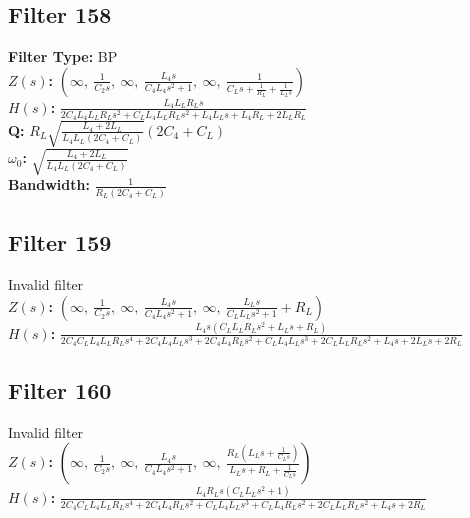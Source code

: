 \documentclass{article}
\begin{document}
\subsection*{Filter 158}
\textbf{Filter Type:} BP \\ 
\textbf{$Z(s)$:} $\left( \infty, \  \frac{1}{C_{2} s}, \  \infty, \  \frac{L_{4} s}{C_{4} L_{4} s^{2} + 1}, \  \infty, \  \frac{1}{C_{L} s + \frac{1}{R_{L}} + \frac{1}{L_{L} s}}\right)$ \\ 
\textbf{$H(s)$:} $\frac{L_{4} L_{L} R_{L} s}{2 C_{4} L_{4} L_{L} R_{L} s^{2} + C_{L} L_{4} L_{L} R_{L} s^{2} + L_{4} L_{L} s + L_{4} R_{L} + 2 L_{L} R_{L}}$ \\ 
\textbf{Q:} $R_{L} \sqrt{\frac{L_{4} + 2 L_{L}}{L_{4} L_{L} \left(2 C_{4} + C_{L}\right)}} \left(2 C_{4} + C_{L}\right)$ \\ 
\textbf{$\omega_0$:} $\sqrt{\frac{L_{4} + 2 L_{L}}{L_{4} L_{L} \left(2 C_{4} + C_{L}\right)}}$ \\ 
\textbf{Bandwidth:} $\frac{1}{R_{L} \left(2 C_{4} + C_{L}\right)}$ \\ 
\subsection*{Filter 159}
Invalid filter \\ 
\textbf{$Z(s)$:} $\left( \infty, \  \frac{1}{C_{2} s}, \  \infty, \  \frac{L_{4} s}{C_{4} L_{4} s^{2} + 1}, \  \infty, \  \frac{L_{L} s}{C_{L} L_{L} s^{2} + 1} + R_{L}\right)$ \\ 
\textbf{$H(s)$:} $\frac{L_{4} s \left(C_{L} L_{L} R_{L} s^{2} + L_{L} s + R_{L}\right)}{2 C_{4} C_{L} L_{4} L_{L} R_{L} s^{4} + 2 C_{4} L_{4} L_{L} s^{3} + 2 C_{4} L_{4} R_{L} s^{2} + C_{L} L_{4} L_{L} s^{3} + 2 C_{L} L_{L} R_{L} s^{2} + L_{4} s + 2 L_{L} s + 2 R_{L}}$ \\ 
\subsection*{Filter 160}
Invalid filter \\ 
\textbf{$Z(s)$:} $\left( \infty, \  \frac{1}{C_{2} s}, \  \infty, \  \frac{L_{4} s}{C_{4} L_{4} s^{2} + 1}, \  \infty, \  \frac{R_{L} \left(L_{L} s + \frac{1}{C_{L} s}\right)}{L_{L} s + R_{L} + \frac{1}{C_{L} s}}\right)$ \\ 
\textbf{$H(s)$:} $\frac{L_{4} R_{L} s \left(C_{L} L_{L} s^{2} + 1\right)}{2 C_{4} C_{L} L_{4} L_{L} R_{L} s^{4} + 2 C_{4} L_{4} R_{L} s^{2} + C_{L} L_{4} L_{L} s^{3} + C_{L} L_{4} R_{L} s^{2} + 2 C_{L} L_{L} R_{L} s^{2} + L_{4} s + 2 R_{L}}$ \\ 
\end{document}
